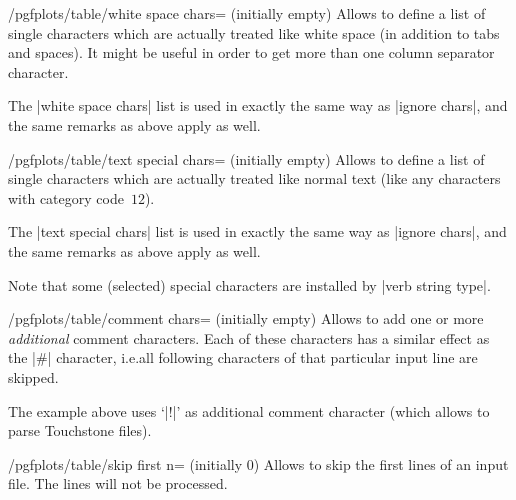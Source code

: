 \documentclass[a4paper]{ltxdoc}
\begin{document}
\begin{key}{/pgfplots/table/white space chars= (initially empty)}
    Allows to define a list of single characters which are actually treated
    like white space (in addition to tabs and spaces). It might be useful in
    order to get more than one column separator character.

    The |white space chars| list is used in exactly the same way as
    |ignore chars|, and the same remarks as above apply as well.
\end{key}

\begin{key}{/pgfplots/table/text special chars= (initially empty)}
    Allows to define a list of single characters which are actually treated
    like normal text (like any characters with category code~$12$).

    The |text special chars| list is used in exactly the same way as
    |ignore chars|, and the same remarks as above apply as well.

    Note that some (selected) special characters are installed by
    |verb string type|.
\begin{codeexample}[]
\end{codeexample}
\end{key}

\begin{key}{/pgfplots/table/comment chars= (initially empty)}
    Allows to add one or more \emph{additional} comment characters. Each of
    these characters has a similar effect as the |#| character, i.e.\@ all
    following characters of that particular input line are skipped.
\begin{codeexample}[]
\end{codeexample}
    The example above uses `|!|' as additional comment character (which allows
    to parse Touchstone files).
\end{key}

\begin{key}{/pgfplots/table/skip first n= (initially 0)}
    Allows to skip the first  lines of an input file. The lines
    will not be processed.
\begin{codeexample}[]
\end{codeexample}
\end{key}
\end{document}
